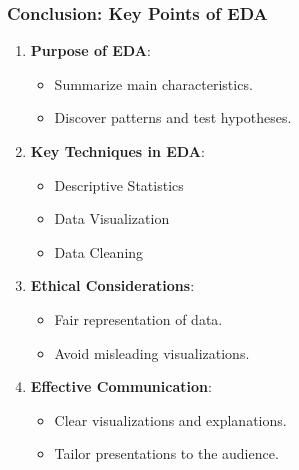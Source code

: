 \documentclass[aspectratio=169]{beamer}
\begin{document}
\begin{frame}[fragile]
    \frametitle{Conclusion: Key Points of EDA}
    \begin{enumerate}
        \item \textbf{Purpose of EDA}:
        \begin{itemize}
            \item Summarize main characteristics.
            \item Discover patterns and test hypotheses.
        \end{itemize}
        \item \textbf{Key Techniques in EDA}:
        \begin{itemize}
            \item Descriptive Statistics
            \item Data Visualization
            \item Data Cleaning
        \end{itemize}
        \item \textbf{Ethical Considerations}:
        \begin{itemize}
            \item Fair representation of data.
            \item Avoid misleading visualizations.
        \end{itemize}
        \item \textbf{Effective Communication}:
        \begin{itemize}
            \item Clear visualizations and explanations.
            \item Tailor presentations to the audience.
        \end{itemize}
    \end{enumerate}
\end{frame}
\end{document}
